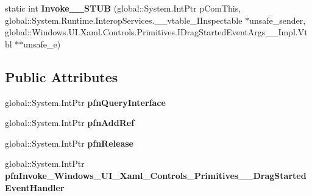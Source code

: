 \begin{DoxyCompactItemize}
\item 
\mbox{\label{struct_windows_1_1_u_i_1_1_xaml_1_1_controls_1_1_primitives_1_1_drag_started_event_handler_____impl_1_1_vtbl_a9276c9fcb95effe92780616f46b359e4}} 
static int {\bfseries Invoke\+\_\+\+\_\+\+S\+T\+UB} (global\+::\+System.\+Int\+Ptr p\+Com\+This, global\+::\+System.\+Runtime.\+Interop\+Services.\+\_\+\+\_\+vtable\+\_\+\+I\+Inspectable $\ast$unsafe\+\_\+sender, global\+::\+Windows.\+U\+I.\+Xaml.\+Controls.\+Primitives.\+I\+Drag\+Started\+Event\+Args\+\_\+\+\_\+\+Impl.\+Vtbl $\ast$$\ast$unsafe\+\_\+e)
\end{DoxyCompactItemize}
\subsection*{Public Attributes}
\begin{DoxyCompactItemize}
\item 
\mbox{\label{struct_windows_1_1_u_i_1_1_xaml_1_1_controls_1_1_primitives_1_1_drag_started_event_handler_____impl_1_1_vtbl_a548e031d51c592a0fd9932e6e0861156}} 
global\+::\+System.\+Int\+Ptr {\bfseries pfn\+Query\+Interface}
\item 
\mbox{\label{struct_windows_1_1_u_i_1_1_xaml_1_1_controls_1_1_primitives_1_1_drag_started_event_handler_____impl_1_1_vtbl_a3a7dac1f97ba896b9bf728b1f86ae51c}} 
global\+::\+System.\+Int\+Ptr {\bfseries pfn\+Add\+Ref}
\item 
\mbox{\label{struct_windows_1_1_u_i_1_1_xaml_1_1_controls_1_1_primitives_1_1_drag_started_event_handler_____impl_1_1_vtbl_a50eea97d47601b8e8e38d6b06dccb0b1}} 
global\+::\+System.\+Int\+Ptr {\bfseries pfn\+Release}
\item 
\mbox{\label{struct_windows_1_1_u_i_1_1_xaml_1_1_controls_1_1_primitives_1_1_drag_started_event_handler_____impl_1_1_vtbl_a6ee23d22d44bc89ccb834bdba997e6f9}} 
global\+::\+System.\+Int\+Ptr {\bfseries pfn\+Invoke\+\_\+\+Windows\+\_\+\+U\+I\+\_\+\+Xaml\+\_\+\+Controls\+\_\+\+Primitives\+\_\+\+\_\+\+Drag\+Started\+Event\+Handler}
\end{DoxyCompactItemize}
